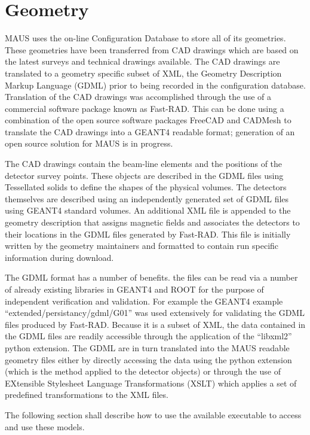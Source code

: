 \chapter{Geometry}
\label{chapter:geometry}
MAUS uses the on-line Configuration Database to store all of its
geometries. These geometries have been transferred from CAD drawings
which are based on the latest surveys and technical drawings
available. The CAD drawings are translated to a geometry specific
subset of XML, the Geometry Description Markup Language (GDML) prior
to being recorded in the configuration database. Translation of the CAD
drawings was accomplished through the use of a commercial software
package known as Fast-RAD. This can be done using a
combination of the open source software packages FreeCAD and
CADMesh to translate the CAD drawings into a GEANT4 readable format;
generation of an open source solution for MAUS is in progress.

The CAD drawings contain the beam-line elements and the positions of
the detector survey points. These objects are described in the GDML
files using Tessellated solids to define the shapes of the physical
volumes. The detectors themselves are described using an independently
generated set of GDML files using GEANT4 standard volumes. An
additional XML file is appended to the geometry description that
assigns magnetic fields and associates the detectors to their
locations in the GDML files generated by Fast-RAD. This file is
initially written by the geometry maintainers and formatted to contain
run specific information during download.

The GDML format has a number of benefits. the files can be read via a
number of already existing libraries in GEANT4 and ROOT for the
purpose of independent verification and validation. For example the
GEANT4 example ``extended/persistancy/gdml/G01'' was used extensively
for validating the GDML files produced by Fast-RAD. Because it is a
subset of XML, the data contained in the GDML files are readily
accessible through the application of the ``libxml2'' python
extension. The GDML are in turn translated into the MAUS readable
geometry files either by directly accessing the data using the python
extension (which is the method applied to the detector objects) or
through the use of EXtensible Stylesheet Language Transformations
(XSLT) which applies a set of predefined transformations to the XML
files.

The following section shall describe how to use the available
executable to access and use these models.

